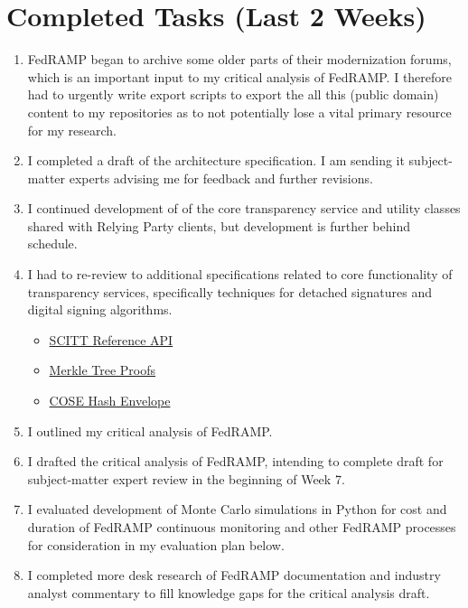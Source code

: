 \documentclass{jdf}
\begin{document}
\section*{Completed Tasks (Last 2 Weeks)}

\begin{enumerate}
    \item FedRAMP began to archive some older parts of their modernization forums, which is an important input to my critical analysis of FedRAMP. I therefore had to urgently write export scripts to export the all this (public domain) content to my repositories as to not potentially lose a vital primary resource for my research.
    \item I completed a draft of the architecture specification. I am sending it subject-matter experts advising me for feedback and further revisions.
    \item I continued development of of the core transparency service and utility classes shared with Relying Party clients, but development is further behind schedule.
    \item I had to re-review to additional specifications related to core functionality of transparency services, specifically techniques for detached signatures and digital signing algorithms.
        \begin{itemize}
            \item \hyperlink{https://datatracker.ietf.org/doc/draft-ietf-scitt-scrapi/}{SCITT Reference API}
            \item \hyperlink{https://datatracker.ietf.org/doc/draft-ietf-cose-merkle-tree-proofs/}{Merkle Tree Proofs}
            \item \hyperlink{https://datatracker.ietf.org/doc/draft-ietf-cose-hash-envelope/}{COSE Hash Envelope}
        \end{itemize}
    \item I outlined my critical analysis of FedRAMP.
    \item I drafted the critical analysis of FedRAMP, intending to complete draft for subject-matter expert review in the beginning of Week 7.
    \item I evaluated development of Monte Carlo simulations in Python for cost and duration of FedRAMP continuous monitoring and other FedRAMP processes for consideration in my evaluation plan below.
    \item I completed more desk research of FedRAMP documentation and industry analyst commentary to fill knowledge gaps for the critical analysis draft.
\end{enumerate}
\end{document}
